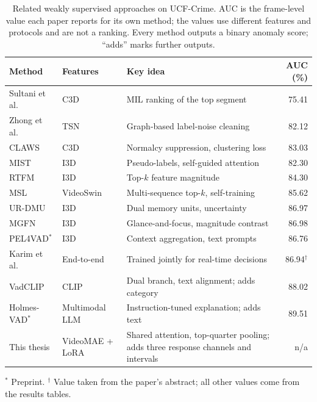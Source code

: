 \begin{table}[!ht]
    \centering
    \small
    \caption[Related weakly supervised approaches on UCF-Crime.]{Related weakly supervised approaches on UCF-Crime. AUC is the frame-level value each paper reports for its own method; the values use different features and protocols and are not a ranking. Every method outputs a binary anomaly score; ``adds'' marks further outputs.}
    \label{tab:related-comparison}
    \begin{tabularx}{\textwidth}{@{}l l >{\raggedright\arraybackslash}X r@{}}
        \toprule
        \textbf{Method} & \textbf{Features} & \textbf{Key idea} & \textbf{AUC (\%)} \\
        \midrule
        Sultani et al.\ \cite{sultani2018real} & C3D & MIL ranking of the top segment & 75.41 \\
        Zhong et al.\ \cite{zhong2019graph} & TSN & Graph-based label-noise cleaning & 82.12 \\
        CLAWS \cite{zaheer2020claws} & C3D & Normalcy suppression, clustering loss & 83.03 \\
        MIST \cite{feng2021mist} & I3D & Pseudo-labels, self-guided attention & 82.30 \\
        RTFM \cite{tian2021weakly} & I3D & Top-$k$ feature magnitude & 84.30 \\
        MSL \cite{li2022self} & VideoSwin & Multi-sequence top-$k$, self-training & 85.62 \\
        UR-DMU \cite{zhou2023ur} & I3D & Dual memory units, uncertainty & 86.97 \\
        MGFN \cite{chen2023mgfn} & I3D & Glance-and-focus, magnitude contrast & 86.98 \\
        PEL4VAD$^{*}$ \cite{pu2023learning} & I3D & Context aggregation, text prompts & 86.76 \\
        Karim et al.\ \cite{realtime2024wacv} & End-to-end & Trained jointly for real-time decisions & 86.94$^{\dagger}$ \\
        VadCLIP \cite{wu2024vadclip} & CLIP & Dual branch, text alignment; adds category & 88.02 \\
        Holmes-VAD$^{*}$ \cite{zhang2024holmes} & Multimodal LLM & Instruction-tuned explanation; adds text & 89.51 \\
        \midrule
        This thesis & VideoMAE + LoRA & Shared attention, top-quarter pooling; adds three response channels and intervals & n/a \\
        \bottomrule
    \end{tabularx}

    \smallskip
    {\footnotesize $^{*}$ Preprint. \quad $^{\dagger}$ Value taken from the paper's abstract; all other values come from the results tables.\par}
\end{table}

